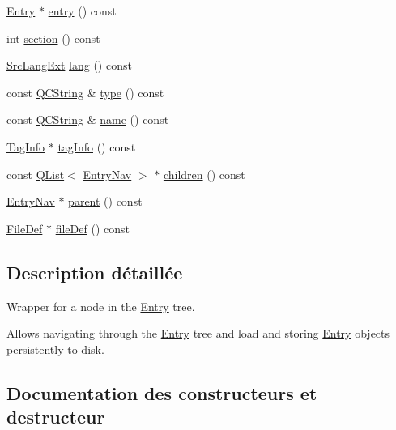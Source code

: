 \begin{DoxyCompactItemize}
\item 
\hyperlink{class_entry}{Entry} $\ast$ \hyperlink{class_entry_nav_ae83c2f83749522f31bf96e2bbb46e04c}{entry} () const 
\item 
int \hyperlink{class_entry_nav_a20d879ec204d36042d7e4da2294a7567}{section} () const 
\item 
\hyperlink{types_8h_a9974623ce72fc23df5d64426b9178bf2}{Src\+Lang\+Ext} \hyperlink{class_entry_nav_a4baef4385b2c51eee0afbe3dfdd222ea}{lang} () const 
\item 
const \hyperlink{class_q_c_string}{Q\+C\+String} \& \hyperlink{class_entry_nav_aa6c45f37e3ab65056807dc3246bf6e5c}{type} () const 
\item 
const \hyperlink{class_q_c_string}{Q\+C\+String} \& \hyperlink{class_entry_nav_a4a518be1a66143bf1706ff5d29208181}{name} () const 
\item 
\hyperlink{struct_tag_info}{Tag\+Info} $\ast$ \hyperlink{class_entry_nav_acd74509ccbdf99f56d87238979ac419f}{tag\+Info} () const 
\item 
const \hyperlink{class_q_list}{Q\+List}$<$ \hyperlink{class_entry_nav}{Entry\+Nav} $>$ $\ast$ \hyperlink{class_entry_nav_a7b56e89137f8d93d36a0fc9c51eeb2d1}{children} () const 
\item 
\hyperlink{class_entry_nav}{Entry\+Nav} $\ast$ \hyperlink{class_entry_nav_ad81958481115dc8d88c74756d8278c5f}{parent} () const 
\item 
\hyperlink{class_file_def}{File\+Def} $\ast$ \hyperlink{class_entry_nav_af3753c9dea44d3a05b80d99f9034dc3d}{file\+Def} () const 
\end{DoxyCompactItemize}


\subsection{Description détaillée}
Wrapper for a node in the \hyperlink{class_entry}{Entry} tree.

Allows navigating through the \hyperlink{class_entry}{Entry} tree and load and storing \hyperlink{class_entry}{Entry} objects persistently to disk. 

\subsection{Documentation des constructeurs et destructeur}
\hypertarget{class_entry_nav_a778223f04da2618c47b697d33d10559d}{}

